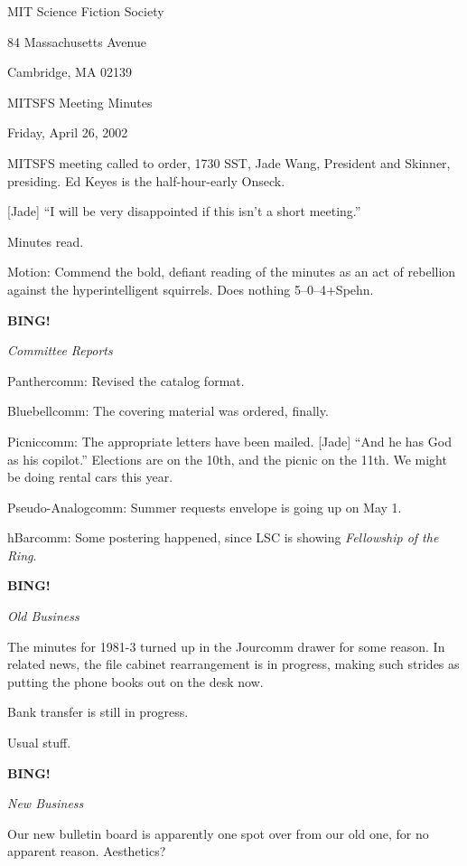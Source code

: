 \documentclass[12pt]{article}
\newcommand{\bing}{{\bf BING!} }
\newcommand{\goto}[1]{\bing \vskip 12pt \centerline{{\em{#1}}}}
\begin{document}
\begin{center}

MIT Science Fiction Society 

84 Massachusetts Avenue

Cambridge, MA 02139

\vspace{12pt}

MITSFS Meeting Minutes 

Friday, April 26, 2002

\end{center}
 
\vspace{18pt}

\setlength{\parskip}{6pt}

\noindent
MITSFS meeting called to order, 1730 SST, Jade Wang, President and
Skinner, presiding.  Ed Keyes is the half-hour-early Onseck.

[Jade] ``I will be very disappointed if this isn't a short meeting.''

Minutes read.

Motion: Commend the bold, defiant reading of the minutes as an act of
rebellion against the hyperintelligent squirrels.  Does nothing
5--0--4+Spehn.

\goto{Committee Reports}

Panthercomm: Revised the catalog format.

Bluebellcomm: The covering material was ordered, finally.

Picniccomm: The appropriate letters have been mailed.  [Jade] ``And he
has God as his copilot.''  Elections are on the 10th, and the picnic
on the 11th.  We might be doing rental cars this year.

Pseudo-Analogcomm: Summer requests envelope is going up on May 1.

hBarcomm: Some postering happened, since LSC is showing {\em Fellowship
of the Ring}.

\goto{Old Business}

The minutes for 1981-3 turned up in the Jourcomm drawer for some reason.
In related news, the file cabinet rearrangement is in progress, making
such strides as putting the phone books out on the desk now.

Bank transfer is still in progress.

Usual stuff.

\goto{New Business}

Our new bulletin board is apparently one spot over from our old one,
for no apparent reason.  Aesthetics?
\end{document}
